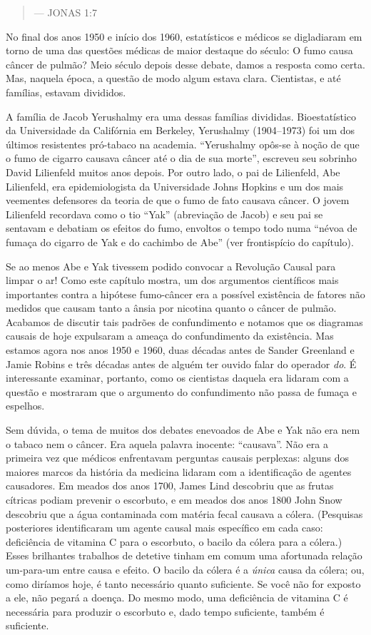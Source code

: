 \documentclass[11pt,a5paper,twoside]{book}
\begin{document}
\begin{quote}
— JONAS 1:7
\end{quote}
No final dos anos 1950 e início dos 1960, estatísticos e médicos se digladiaram em torno de uma das questões médicas de maior destaque do século: O fumo causa câncer de pulmão? Meio século depois desse debate, damos a resposta como certa. Mas, naquela época, a questão de modo algum estava clara. Cientistas, e até famílias, estavam divididos.

A família de Jacob Yerushalmy era uma dessas famílias divididas. Bioestatístico da Universidade da Califórnia em Berkeley, Yerushalmy (1904–1973) foi um dos últimos resistentes pró-tabaco na academia. “Yerushalmy opôs-se à noção de que o fumo de cigarro causava câncer até o dia de sua morte”, escreveu seu sobrinho David Lilienfeld muitos anos depois. Por outro lado, o pai de Lilienfeld, Abe Lilienfeld, era epidemiologista da Universidade Johns Hopkins e um dos mais veementes defensores da teoria de que o fumo de fato causava câncer. O jovem Lilienfeld recordava como o tio “Yak” (abreviação de Jacob) e seu pai se sentavam e debatiam os efeitos do fumo, envoltos o tempo todo numa “névoa de fumaça do cigarro de Yak e do cachimbo de Abe” (ver frontispício do capítulo).

Se ao menos Abe e Yak tivessem podido convocar a Revolução Causal para limpar o ar! Como este capítulo mostra, um dos argumentos científicos mais importantes contra a hipótese fumo-câncer era a possível existência de fatores não medidos que causam tanto a ânsia por nicotina quanto o câncer de pulmão. Acabamos de discutir tais padrões de confundimento e notamos que os diagramas causais de hoje expulsaram a ameaça do confundimento da existência. Mas estamos agora nos anos 1950 e 1960, duas décadas antes de Sander Greenland e Jamie Robins e três décadas antes de alguém ter ouvido falar do operador \textit{do}. É interessante examinar, portanto, como os cientistas daquela era lidaram com a questão e mostraram que o argumento do confundimento não passa de fumaça e espelhos.

Sem dúvida, o tema de muitos dos debates enevoados de Abe e Yak não era nem o tabaco nem o câncer. Era aquela palavra inocente: “causava”. Não era a primeira vez que médicos enfrentavam perguntas causais perplexas: alguns dos maiores marcos da história da medicina lidaram com a identificação de agentes causadores. Em meados dos anos 1700, James Lind descobriu que as frutas cítricas podiam prevenir o escorbuto, e em meados dos anos 1800 John Snow descobriu que a água contaminada com matéria fecal causava a cólera. (Pesquisas posteriores identificaram um agente causal mais específico em cada caso: deficiência de vitamina C para o escorbuto, o bacilo da cólera para a cólera.) Esses brilhantes trabalhos de detetive tinham em comum uma afortunada relação um-para-um entre causa e efeito. O bacilo da cólera é a \textit{única} causa da cólera; ou, como diríamos hoje, é tanto necessário quanto suficiente. Se você não for exposto a ele, não pegará a doença. Do mesmo modo, uma deficiência de vitamina C é necessária para produzir o escorbuto e, dado tempo suficiente, também é suficiente.
\end{document}
